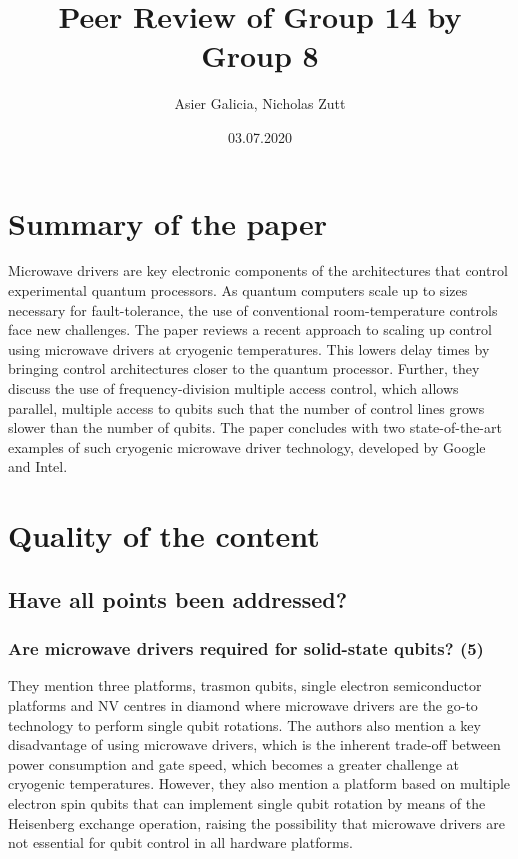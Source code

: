 \documentclass[11pt]{article}
\author{Asier Galicia, Nicholas Zutt}
\date{03.07.2020}
\title{Peer Review of Group 14 by Group 8}
\begin{document}
\maketitle

\section{Summary of the paper}
\label{sec:org1920089}

Microwave drivers are key electronic components of the architectures
that control experimental quantum processors. As quantum computers
scale up to sizes necessary for fault-tolerance, the use of
conventional room-temperature controls face new challenges. The paper
reviews a recent approach to scaling up control using microwave
drivers at cryogenic temperatures. This lowers delay times by bringing
control architectures closer to the quantum processor. Further, they
discuss the use of frequency-division multiple access control, which
allows parallel, multiple access to qubits such that the number of
control lines grows slower than the number of qubits. The paper
concludes with two state-of-the-art examples of such cryogenic
microwave driver technology, developed by Google and Intel.

\section{Quality of the content}
\label{sec:org0be0e18}

\subsection{Have all points been addressed?}
\label{sec:org8901d4b}

\subsubsection{Are microwave drivers required for solid-state qubits? (5)}
\label{sec:org7b3309a}
They mention three platforms, trasmon qubits, single electron
semiconductor platforms and NV centres in diamond where microwave
drivers are the go-to technology to perform single qubit
rotations. The authors also mention a key disadvantage of using
microwave drivers, which is the inherent trade-off between power
consumption and gate speed, which becomes a greater challenge at
cryogenic temperatures. However, they also mention a platform
based on multiple electron spin qubits that can implement single
qubit rotation by means of the Heisenberg exchange operation,
raising the possibility that microwave drivers are not essential
for qubit control in all hardware platforms.
\end{document}
